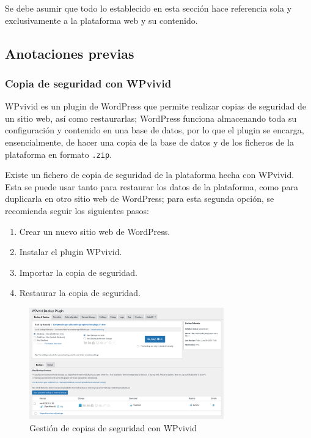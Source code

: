         Se debe asumir que todo lo establecido en esta sección hace referencia sola y exclusivamente a la plataforma web y su contenido.

        \subsection{Anotaciones previas}

            \subsubsection{Copia de seguridad con WPvivid}

                WPvivid \cite{wpvivid} es un plugin de WordPress que permite realizar copias de seguridad de un sitio web, así como restaurarlas; WordPress funciona almacenando toda su configuración y contenido en una base de datos, por lo que el plugin se encarga, ensencialmente, de hacer una copia de la base de datos y de los ficheros de la plataforma en formato \texttt{.zip}.

                Existe un fichero de copia de seguridad de la plataforma hecha con WPvivid. Esta se puede usar tanto para restaurar los datos de la plataforma, como para duplicarla en otro sitio web de WordPress; para esta segunda opción, se recomienda seguir los siguientes pasos:
                
                \begin{enumerate}
                    \item Crear un nuevo sitio web de WordPress.
                    \item Instalar el plugin WPvivid.
                    \item Importar la copia de seguridad.
                    \item Restaurar la copia de seguridad.
                \end{enumerate}

                \begin{figure}
                    \centering

                    \includegraphics[width=0.75\textwidth]{images/Capturas/localhost/wpvivid.png}
                    \caption{Gestión de copias de seguridad con WPvivid}
                    \label{fig:wpvivid}
                \end{figure}


